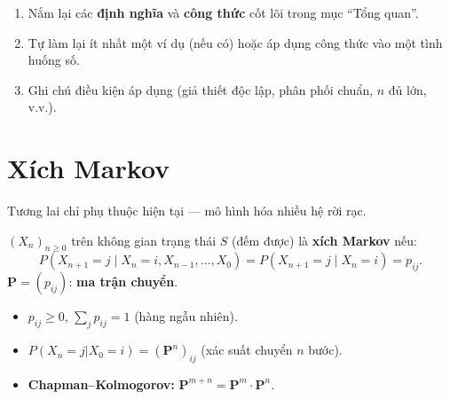 \documentclass[12pt,a4paper]{article}
\begin{document}

\begin{tongket}[title={Tổng kết: Tổng quan}]
\begin{enumerate}
  \item Nắm lại các \textbf{định nghĩa} và \textbf{công thức} cốt lõi trong mục ``Tổng quan''.
  \item Tự làm lại ít nhất một ví dụ (nếu có) hoặc áp dụng công thức vào một tình huống số.
  \item Ghi chú điều kiện áp dụng (giả thiết độc lập, phân phối chuẩn, $n$ đủ lớn, v.v.).
\end{enumerate}
\end{tongket}

\section{Xích Markov}

\begin{dongco}[title={Động cơ --- Xích Markov}]
Tương lai chỉ phụ thuộc hiện tại --- mô hình hóa nhiều hệ rời rạc.
\end{dongco}

\begin{dinhnghia}
  $(X_n)_{n \ge 0}$ trên không gian trạng thái $S$ (đếm được) là \textbf{xích Markov} nếu:
  \[
    P(X_{n+1} = j \mid X_n = i, X_{n-1}, \ldots, X_0) = P(X_{n+1} = j \mid X_n = i) = p_{ij}.
  \]
  $\mathbf{P} = (p_{ij})$: \textbf{ma trận chuyển}.
\end{dinhnghia}

\begin{tinhchat}
  \begin{itemize}
    \item $p_{ij} \ge 0$, $\sum_j p_{ij} = 1$ (hàng ngẫu nhiên).
    \item $P(X_n = j | X_0 = i) = (\mathbf{P}^n)_{ij}$ (xác suất chuyển $n$ bước).
    \item \textbf{Chapman--Kolmogorov:} $\mathbf{P}^{m+n} = \mathbf{P}^m \cdot \mathbf{P}^n$.
  \end{itemize}
\end{tinhchat}
\end{document}
